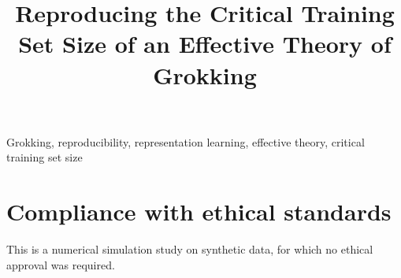 \documentclass{article}
\title{Reproducing the Critical Training Set Size of an Effective Theory
       of Grokking}
\begin{document}
\maketitle

\begin{abstract}

\end{abstract}

\begin{keywords}
Grokking, reproducibility, representation learning, effective theory,
critical training set size
\end{keywords}








\section{Compliance with ethical standards}
\label{sec:ethics}
This is a numerical simulation study on synthetic data, for which no
ethical approval was required.



\end{document}
